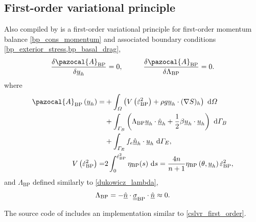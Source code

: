 \subsection{First-order variational principle} \label{ssn_first_order_var_prin}

Also compiled by \citet{dukowicz_2011} is a first-order variational principle for first-order momentum balance \cref{bp_cons_momentum} and associated boundary conditions \cref{bp_exterior_stress,bp_basal_drag},
\begin{align}
  \label{bp_extremum}
  \frac{\delta \pazocal{A}_{\text{BP}}}{\delta \rankone{u}_h} = 0, \hspace{10mm} \frac{\delta \pazocal{A}_{\text{BP}}}{\delta \Lambda_{\text{BP}}} = 0.
\end{align}
where
\begin{align}
  \label{bp_action}
  \pazocal{A}_{\text{BP}} \left(\rankone{u}_h \right) = &+ \int_{\Omega} \left( V\left( \dot{\varepsilon}_{\text{BP}}^2 \right) + \rho g \rankone{u}_h \cdot (\nabla S)_h \right) \d{\Omega} \notag \\
  &+ \int_{\Gamma_B} \left( \Lambda_{\text{BP}} \rankone{u}_h \cdot \normal_h + \frac{1}{2} \beta \rankone{u}_h \cdot \rankone{u}_h \right) \d{\Gamma_B} \notag \\
  &+ \int_{\Gamma_E} f_e \normal_h \cdot \rankone{u}_h \d{\Gamma_E}, \\
  \label{bp_viscous_dissipation}
  V\left( \dot{\varepsilon}_{\text{BP}}^2 \right) = & 2 \int_0^{\dot{\varepsilon}_{\text{BP}}^2} \eta_{\text{BP}}(s) \d{s} = \frac{4n}{n+1} \eta_{\text{BP}}\left(\theta, \rankone{u}_h \right) \dot{\varepsilon}_{\text{BP}}^2,
\end{align}
and $\Lambda_{\text{BP}}$ defined similarly to \cref{dukowicz_lambda},
\begin{align}
  \label{bp_dukowicz_lambda}
  \Lambda_{\text{BP}} = - \underline{\hat{n}} \cdot \underline{\underline{\sigma}}_{\text{BP}} \cdot \underline{\hat{n}} \approx 0.
\end{align}

The source code of \CSLVR includes an implementation similar to \cref{cslvr_first_order}.

